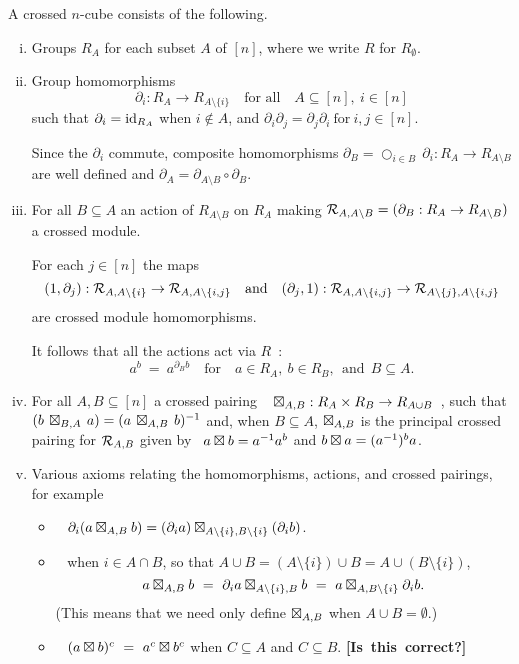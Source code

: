 \bigskip
A crossed $n$-cube consists of the following.
\begin{enumerate}[(i)]
\item
Groups  $R_A$  for each subset  $A$  of  $[n]$,
where we write $R$ for $R_{\emptyset}$.

\item
Group homomorphisms
$$
\partial_i : R_A \to R_{A \setminus \{i\}}  \quad\mbox{for all} \quad 
A \subseteq [n],~ i \in [n]
$$
such that  $\partial_i = \mathrm{id}_{R_A}$  when  $i \notin A$,
and  $\partial_i\partial_j = \partial_j\partial_i ~\mbox{for}~ i,j \in [n]$.

\noindent
Since the $\partial_i$ commute, composite homomorphisms
$\partial_B = \bigcirc_{i \in B}\,\partial_i : R_A \to R_{A \setminus B}$ 
are well defined and 
$\partial_A = \partial_{A \setminus B} \circ \partial_B$. 

\item
For all $B \subseteq A$ an action of $R_{A \setminus B}$ on $R_A$
making $\mathcal{R}_{A,A \setminus B} = (\partial_B : R_A \to R_{A \setminus B})$
a crossed module.

For each $j \in [n]$ the maps 
$$
(1,\partial_j) : \mathcal{R}_{A,A \setminus \{i\}} \to 
\mathcal{R}_{A,A \setminus \{i,j\}}
\quad\mbox{and}\quad
(\partial_j,1) : \mathcal{R}_{A,A \setminus \{i,j\}} \to 
\mathcal{R}_{A \setminus \{j\},A \setminus \{i,j\}}
$$
are crossed module homomorphisms.

It follows that all the actions act via $R$~:
$$
a^b ~=~ a^{\partial_B b} \quad\mbox{for}\quad
a \in R_A,~ b \in R_B, ~~\mbox{and}~~ B \subseteq A.
$$

\item
For all  $A,B \subseteq [n]$  a crossed pairing  ~
$\boxtimes_{A,B} : R_A \times R_B \to R_{A \cup B}$~,
such that
$(b\,\boxtimes_{B,A}\,a) = (a\,\boxtimes_{A,B}\,b)^{-1}$  and, when $B \subseteq A$,
$\boxtimes_{A,B}$  is the principal crossed pairing for $\mathcal{R}_{A,B}$ 
given by ~$a \boxtimes b = a^{-1}a^b$ and $b \boxtimes a = (a^{-1})^ba$.

\item
Various axioms relating the homomorphisms, actions, and crossed pairings, 
for example
\begin{itemize}
\item~ $\partial_i(a \boxtimes_{A,B} b) = 
        (\partial_i a) \boxtimes_{A\setminus\{i\},B\setminus\{i\}} (\partial_i b)$.
\item~ when $i \in A \cap B$, so that
$A \cup B = (A \setminus \{i\}) \cup B = A \cup (B \setminus \{i\})$,
$$
a \boxtimes_{A,B} b
~=~ \partial_i a \boxtimes_{A\setminus\{i\},B} b
~=~ a \boxtimes_{A,B\setminus\{i\}} \partial_i b.
$$
(This means that we need only define $\boxtimes_{A,B}$ when $A \cup B = \emptyset$.)
\item~ $(a \boxtimes b)^c ~=~ a^c \boxtimes b^c$ when $C \subseteq A$ and $C \subseteq B$.
\qquad
\mbox{{\bf [Is this correct?]}}
\end{itemize}
\end{enumerate}

